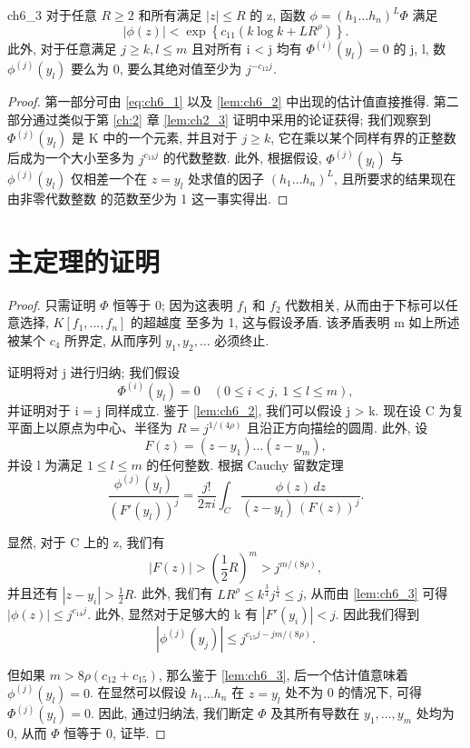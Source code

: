 \begin{mylemma}{}{ch6_3}
对于任意 $R \ge 2$ 和所有满足 $|z| \le R$ 的 z, 函数 $\phi = (h_1 \dots h_n)^L \Phi$ 满足
\[|\phi(z)| < \exp\left\{c_{11}(k\log k + LR^{\rho})\right\}.\]
此外, 对于任意满足 $j \ge k, l \le m$ 且对所有 i < j 均有 $\Phi^{(i)}(y_l) = 0$ 的 j, l, 数 $\phi^{(j)}(y_l)$ 要么为 0, 要么其绝对值至少为 $j^{-c_{12}j}$.
\end{mylemma}

\begin{proof}
第一部分可由 \eqref{eq:ch6_1} 以及 \autoref{lem:ch6_2} 中出现的估计值直接推得. 第二部分通过类似于第 \ref{ch:2} 章 \autoref{lem:ch2_3} 证明中采用的论证获得; 我们观察到 $\Phi^{(j)}(y_l)$ 是 K 中的一个元素, 并且对于 $j \ge k$, 它在乘以某个同样有界的正整数后成为一个大小至多为 $j^{c_{13}j}$ 的代数整数. 此外, 根据假设, $\Phi^{(j)}(y_l)$ 与 $\phi^{(j)}(y_l)$ 仅相差一个在 $z = y_l$ 处求值的因子 $(h_1 \dots h_n)^L$, 且所要求的结果现在由非零代数整数 的范数至少为 1 这一事实得出.
\end{proof}

\section{主定理的证明}

\begin{proof}
只需证明 $\Phi$ 恒等于 0; 因为这表明 $f_1$ 和 $f_2$ 代数相关, 从而由于下标可以任意选择, $K[f_1, \dots, f_n]$ 的超越度 至多为 1, 这与假设矛盾. 该矛盾表明 m 如上所述被某个 $c_4$ 所界定, 从而序列 $y_1, y_2, \dots$ 必须终止.

证明将对 j 进行归纳; 我们假设
\[\Phi^{(i)}(y_l) = 0 \quad (0 \le i < j, \ 1 \le l \le m),\]
并证明对于 i = j 同样成立. 鉴于 \autoref{lem:ch6_2}, 我们可以假设 j > k. 现在设 C 为复平面上以原点为中心、半径为 $R = j^{1/(4\rho)}$ 且沿正方向描绘的圆周. 此外, 设
\[F(z) = (z - y_1) \dots (z - y_m),\]
并设 l 为满足 $1 \leq l \leq m$ 的任何整数. 根据 Cauchy 留数定理
\[\frac{\phi^{(j)}(y_l)}{(F'(y_l))^j} = \frac{j!}{2\pi i} \int_C \frac{\phi(z)\,dz}{(z-y_l)\,(F(z))^j}.\]

显然, 对于 C 上的 z, 我们有
\[|F(z)| > (\frac{1}{2}R)^m > j^{m/(8\rho)},\]
并且还有 $|z-y_i| > \frac{1}{2}R$. 此外, 我们有 $LR^{\rho} \leq k^{\frac{3}{4}}j^{\frac{1}{4}} \leq j$, 从而由 \autoref{lem:ch6_3} 可得 $|\phi(z)| \leq j^{c_{14}j}$. 此外, 显然对于足够大的 k  有 $|F'(y_i)| < j$. 因此我们得到
\[|\phi^{(j)}(y_j)| \leq j^{c_{15}j-jm/(8\rho)}.\]

但如果 $m > 8\rho(c_{12} + c_{15})$, 那么鉴于 \autoref{lem:ch6_3}, 后一个估计值意味着 $\phi^{(j)}(y_l) = 0$. 在显然可以假设 $h_1 \dots h_n$ 在 $z = y_l$ 处不为 0 的情况下, 可得 $\Phi^{(j)}(y_l) = 0$. 因此, 通过归纳法, 我们断定 $\Phi$ 及其所有导数在 $y_1, \dots, y_m$ 处均为 0, 从而 $\Phi$ 恒等于 0, 证毕.
\end{proof}

